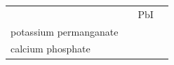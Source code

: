\begin{enumerate}[noitemsep, label=\textbf{\arabic*}. ]
{\begin{center}
\begin{xtabular*}{\mytablewidth}[t]{|p{10\mystarwidth}|p{10\mystarwidth}|p{10\mystarwidth}|p{10\mystarwidth}|}
    
         &
    
    
         &
    
    
        \begin{math}\mathrm{PbI}\end{math}%
     \tabularnewline{}
    
    
        potassium permanganate &
    
    
         &
    
    
         &
    
    
     \tabularnewline{}
    
    
        calcium phosphate &
    

\end{xtabular*}
\end{center}}
\end{enumerate}
